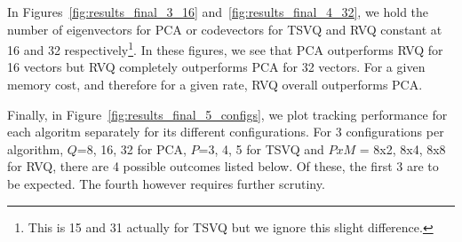 In Figures~\ref{fig:results_final_3_16} and~\ref{fig:results_final_4_32}, we hold the number of eigenvectors for PCA or codevectors for TSVQ and RVQ constant at 16 and 32 respectively\footnote{This is 15 and 31 actually for TSVQ but we ignore this slight difference.}.  In these figures, we see that PCA outperforms RVQ for 16 vectors but RVQ completely outperforms PCA for 32 vectors.  For a given memory cost, and therefore for a given rate, RVQ overall outperforms PCA.  

Finally, in Figure~\ref{fig:results_final_5_configs}, we plot tracking performance for each algoritm separately for its different configurations.  For 3 configurations per algorithm, $Q$=8, 16, 32 for PCA, $P$=3, 4, 5 for TSVQ and $PxM$ = 8x2, 8x4, 8x8 for RVQ, there are 4 possible outcomes listed below.  Of these, the first 3 are to be expected.  The fourth however requires further scrutiny.

